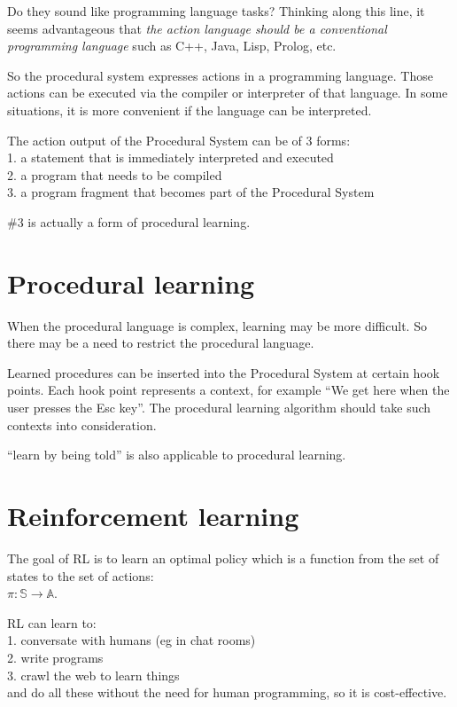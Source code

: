 Do they sound like programming language tasks?  Thinking along this line, it seems advantageous that \textit{the action language should be a conventional programming language} such as C++, Java, Lisp,  Prolog, etc.

So the procedural system expresses actions in a programming language.  Those actions can be executed via the compiler or interpreter of that language.  In some situations, it is more convenient if the language can be interpreted.

The action output of the Procedural System can be of 3 forms:\\
1. a statement that is immediately interpreted and executed\\
2. a program that needs to be compiled\\
3. a program fragment that becomes part of the Procedural System

\#3 is actually a form of procedural learning.

\section{Procedural learning}
\label{sec:ProceduralLearning}

When the procedural language is complex, learning may be more difficult.  So there may be a need to restrict the procedural language.  %

Learned procedures can be inserted into the Procedural System at certain hook points.  Each hook point represents a context, for example ``We get here when the user presses the Esc key''.  The procedural learning algorithm should take such contexts into consideration.

``learn by being told'' is also applicable to procedural learning.

\section{Reinforcement learning} 
\label{sec:RL}

The goal of RL is to learn an optimal policy which is a function from the set of states to the set of actions:\\
\hspace*{1cm} $\pi: \mathbb{S} \rightarrow \mathbb{A}$.

RL can learn to:\\
1.  conversate with humans (eg in chat rooms)\\
2.  write programs\\
3.  crawl the web to learn things\\
and do all these without the need for human programming, so it is cost-effective.

